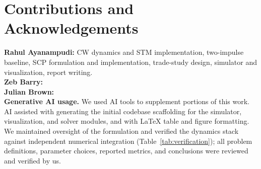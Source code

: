 \documentclass[10pt,twocolumn,letterpaper]{article}
\begin{document}
\section*{Contributions and Acknowledgements}

\textbf{Rahul Ayanampudi:} CW dynamics and STM implementation, two-impulse
baseline, SCP formulation and implementation, trade-study design, simulator
and visualization, report writing.\\

\textbf{Zeb Barry:} %
\\

\textbf{Julian Brown:} %
\\

\textbf{Generative AI usage.} We used AI tools to supplement portions of this
work. AI assisted with generating the initial codebase scaffolding for the
simulator, visualization, and solver modules, and with LaTeX table and figure
formatting. We maintained oversight of the formulation and verified the
dynamics stack against independent numerical integration
(Table~\ref{tab:verification}); all problem definitions, parameter choices,
reported metrics, and conclusions were reviewed and verified by us.
\end{document}
